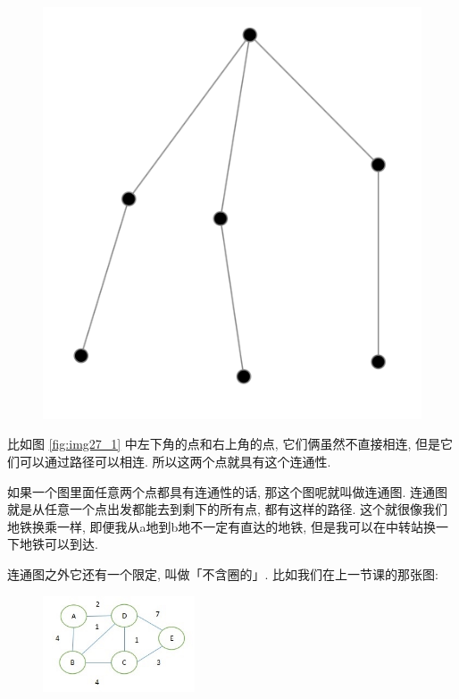\begin{figure}[ht]
\begin{minipage}[t]{0.3\textwidth}
    \includegraphics[width=\textwidth]{asset/20230924092635.png}
    \caption{}
    \label{fig:img27_2}
  \end{minipage}%
\end{figure}

比如图 \ref{fig:img27_1} 中左下角的点和右上角的点, 它们俩虽然不直接相连, 但是它们可以通过路径可以相连. 所以这两个点就具有这个连通性. 

如果一个图里面任意两个点都具有连通性的话, 那这个图呢就叫做连通图. 连通图就是从任意一个点出发都能去到剩下的所有点, 都有这样的路径. 这个就很像我们地铁换乘一样, 即便我从a地到b地不一定有直达的地铁, 但是我可以在中转站换一下地铁可以到达. 

连通图之外它还有一个限定, 叫做「不含圈的」. 比如我们在上一节课的那张图: 

\begin{figure}[ht]
  \centering
  \includegraphics[width=0.4\textwidth]{asset/20230924051221.jpg}
  \caption{}
  \label{fig:img27_3}
\end{figure}

